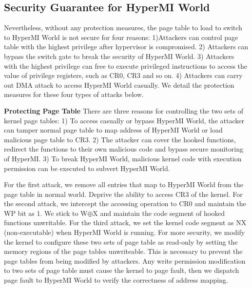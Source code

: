 \documentclass[conference]{IEEEtran}
\begin{document}
\subsection{Security Guarantee for HyperMI World}\label {SG}
Nevertheless, without any protection measures, the page table to load to switch to HyperMI World is not secure for four reasons: 1)Attackers can control page table with the highest privilege after hypervisor is compromised. 2) Attackers can bypass the switch gate to break the security of HyperMI World. 3) Attackers with the highest privilege can free to execute privileged instructions to access the value of privilege registers, such as CR0, CR3 and so on. 4) Attackers can carry out DMA attack to access HyperMI World casually.
We detail the protection measures for these four types of attacks below.



\textbf{Protecting Page Table}
There are three reasons for controlling the two sets of kernel page tables: 1) To access casually or bypass HyperMI World, the attacker can tamper normal page table to map address of HyperMI World or load malicious page table to CR3.
2) The attacker can cover the hooked functions, redirect the functions to their own malicious code and bypass secure monitoring of HyperMI. 3) To break HyperMI World, malicious kernel code with execution permission can be executed to subvert HyperMI World.

For the first attack, %
we remove all entries that map to HyperMI World from the page table in normal world. Deprive the ability to access CR3 of the kernel.%
For the second attack, we intercept the accessing operation to CR0 and maintain the WP bit as 1. We stick to W$\oplus${X} and maintain the code segment of hooked functions unwritable.
For the third attack, we set the kernel code segment as NX (non-executable) when HyperMI World is running. For more security, we modify the kernel to configure these two sets of page table as read-only by setting the memory regions of the page tables unwriteable. This is necessary to prevent the page tables from being modified by attackers. Any write permission modification to two sets of page table must cause the kernel to page fault, then we dispatch page fault to HyperMI World to verify the correctness of address mapping. 
\end{document}

